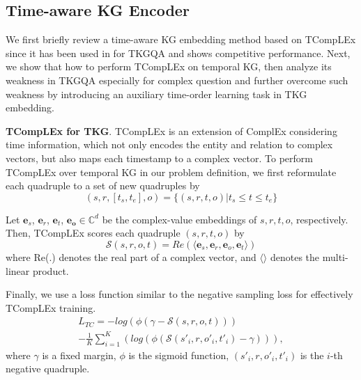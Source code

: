 \documentclass[11pt]{article}
\newcommand{\xhdr}[1]{{\noindent\bfseries #1}.}
\newcommand{\peng}[1]{{{\color{purple!60!blue}{[peng: #1]}}}}
\newcommand{\gt}[1]{{{\textcolor{cyan}{[gt: #1]}}}}
\begin{document}
\subsection{Time-aware KG Encoder}

We first briefly review a time-aware KG embedding method based on TCompLEx \cite{lacroix2020tensor} since it has been used in \cite{saxena2021question} for TKGQA and shows competitive performance. Next, we show that how to perform TCompLEx on temporal KG, then analyze its weakness in TKGQA especially for complex question and further overcome such weakness by introducing an auxiliary time-order learning task in TKG embedding.


\xhdr{TCompLEx for TKG} TCompLEx is an extension of ComplEx considering time information, which not only encodes the entity and relation to complex vectors, but also maps each timestamp to a complex vector. To perform TCompLEx over temporal KG in our problem definition, we first reformulate each quadruple to a set of new quadruples by
\begin{equation}
    (s, r, [t_s, t_e], o) = \{(s, r, t, o)| t_s \leq t \leq t_e\}
\end{equation}


Let $\bm{e}_s$, $\bm{e}_r$, $\bm{e}_t$, $\bm{e_o}\in \mathbb{C}^{d}$ be the complex-value embeddings of $s, r, t, o$, respectively. Then, TCompLEx scores each quadruple $(s, r, t, o)$ by
\begin{equation}
\mathcal{S}(s,r,o,t) = Re(\langle \bm{e}_s, \bm{e}_r, \bm{e}_o, \bm{e}_t \rangle)
\end{equation}
where Re(.) denotes the real part of a complex vector, and $\langle\rangle$ denotes the multi-linear product.

Finally, we use a loss function similar to the negative sampling loss for effectively TCompLEx training.
\begin{equation}\label{eq:tcomplex_loss}
\begin{split}
   L_{TC} = -log(\phi(\gamma - \mathcal{S}(s,r,o,t))) \\ - \frac{1}{K}\sum_{i=1}^{K}(log(\phi(\mathcal{S}(s'_{i},r,o'_{i},t'_{i}) - \gamma))),
\end{split}
\end{equation}
where $\gamma$ is a fixed margin, $\phi$ is the sigmoid function, $(s'_{i},r,o'_{i},t'_{i})$ is the $i$-th negative quadruple.
\end{document}

